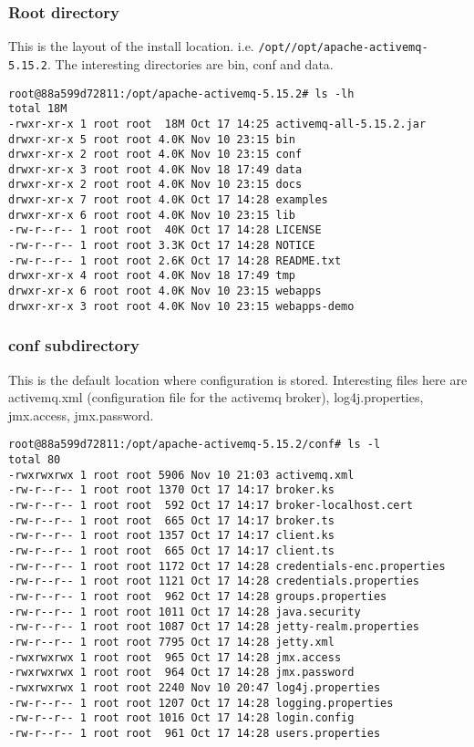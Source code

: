     \subsubsection{Root directory}
    This is the layout of the install location. i.e. \verb+/opt//opt/apache-activemq-5.15.2+. The interesting directories are bin, conf and data.
    \begin{lstlisting}[caption={Sample root directory layout}]
root@88a599d72811:/opt/apache-activemq-5.15.2# ls -lh 
total 18M
-rwxr-xr-x 1 root root  18M Oct 17 14:25 activemq-all-5.15.2.jar
drwxr-xr-x 5 root root 4.0K Nov 10 23:15 bin
drwxr-xr-x 2 root root 4.0K Nov 10 23:15 conf
drwxr-xr-x 3 root root 4.0K Nov 18 17:49 data
drwxr-xr-x 2 root root 4.0K Nov 10 23:15 docs
drwxr-xr-x 7 root root 4.0K Oct 17 14:28 examples
drwxr-xr-x 6 root root 4.0K Nov 10 23:15 lib
-rw-r--r-- 1 root root  40K Oct 17 14:28 LICENSE
-rw-r--r-- 1 root root 3.3K Oct 17 14:28 NOTICE
-rw-r--r-- 1 root root 2.6K Oct 17 14:28 README.txt
drwxr-xr-x 4 root root 4.0K Nov 18 17:49 tmp
drwxr-xr-x 6 root root 4.0K Nov 10 23:15 webapps
drwxr-xr-x 3 root root 4.0K Nov 10 23:15 webapps-demo
    \end{lstlisting}

    \subsubsection{conf subdirectory}
    This is the default location where configuration is stored. Interesting files here are activemq.xml (configuration file for the activemq broker), log4j.properties, jmx.access, jmx.password.
    \begin{lstlisting}[caption={Sample conf sub-directory layout}]
    root@88a599d72811:/opt/apache-activemq-5.15.2/conf# ls -l  
total 80
-rwxrwxrwx 1 root root 5906 Nov 10 21:03 activemq.xml
-rw-r--r-- 1 root root 1370 Oct 17 14:17 broker.ks
-rw-r--r-- 1 root root  592 Oct 17 14:17 broker-localhost.cert
-rw-r--r-- 1 root root  665 Oct 17 14:17 broker.ts
-rw-r--r-- 1 root root 1357 Oct 17 14:17 client.ks
-rw-r--r-- 1 root root  665 Oct 17 14:17 client.ts
-rw-r--r-- 1 root root 1172 Oct 17 14:28 credentials-enc.properties
-rw-r--r-- 1 root root 1121 Oct 17 14:28 credentials.properties
-rw-r--r-- 1 root root  962 Oct 17 14:28 groups.properties
-rw-r--r-- 1 root root 1011 Oct 17 14:28 java.security
-rw-r--r-- 1 root root 1087 Oct 17 14:28 jetty-realm.properties
-rw-r--r-- 1 root root 7795 Oct 17 14:28 jetty.xml
-rwxrwxrwx 1 root root  965 Oct 17 14:28 jmx.access
-rwxrwxrwx 1 root root  964 Oct 17 14:28 jmx.password
-rwxrwxrwx 1 root root 2240 Nov 10 20:47 log4j.properties
-rw-r--r-- 1 root root 1207 Oct 17 14:28 logging.properties
-rw-r--r-- 1 root root 1016 Oct 17 14:28 login.config
-rw-r--r-- 1 root root  961 Oct 17 14:28 users.properties
    \end{lstlisting}

